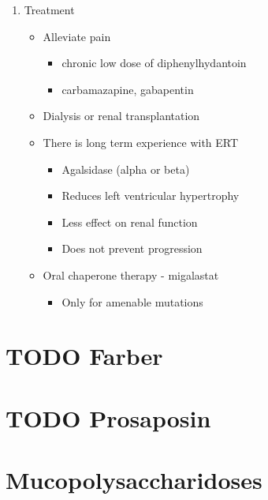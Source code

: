 \documentclass{scrartcl}
\begin{document}
\begin{enumerate}
\item Treatment
\label{sec:orgac077f9}
\begin{itemize}
\item Alleviate pain
\begin{itemize}
\item chronic low dose of diphenylhydantoin
\item carbamazapine, gabapentin
\end{itemize}
\item Dialysis or renal transplantation
\item There is long term experience with ERT
\begin{itemize}
\item Agalsidase (alpha or beta)
\item Reduces left ventricular hypertrophy
\item Less effect on renal function
\item Does not prevent progression
\end{itemize}
\item Oral chaperone therapy - migalastat
\begin{itemize}
\item Only for amenable mutations
\end{itemize}
\end{itemize}
\end{enumerate}

\section{{\bfseries\sffamily TODO} Farber}
\label{sec:org49550f9}

\section{{\bfseries\sffamily TODO} Prosaposin}
\label{sec:org2fad01b}

\section{Mucopolysaccharidoses}
\label{sec:orga719ee4}
\end{document}
